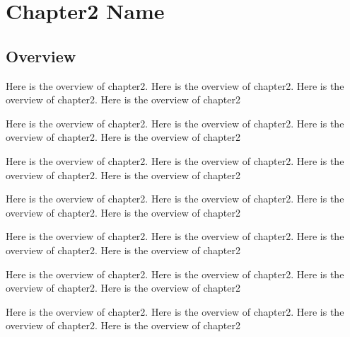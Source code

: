 \ifx\allfiles\undefined
	
\else
	
\fi
\chapter{Chapter2 Name}
\section{Overview}
Here is the overview of chapter2. Here is the overview of chapter2. Here is the overview of chapter2. Here is the overview of chapter2

Here is the overview of chapter2. Here is the overview of chapter2. Here is the overview of chapter2. Here is the overview of chapter2

Here is the overview of chapter2. Here is the overview of chapter2. Here is the overview of chapter2. Here is the overview of chapter2

Here is the overview of chapter2. Here is the overview of chapter2. Here is the overview of chapter2. Here is the overview of chapter2

Here is the overview of chapter2. Here is the overview of chapter2. Here is the overview of chapter2. Here is the overview of chapter2

Here is the overview of chapter2. Here is the overview of chapter2. Here is the overview of chapter2. Here is the overview of chapter2

Here is the overview of chapter2. Here is the overview of chapter2. Here is the overview of chapter2. Here is the overview of chapter2


